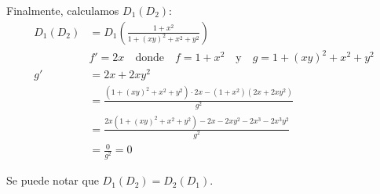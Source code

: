 \documentclass{report}
\begin{document}
    Finalmente, calculamos $D_{1}\left(D_{2}\right)$:
    \[
    \begin{aligned}
    D_{1}\left(D_{2}\right) &= D_{1}\left(\frac{1 + x^{2}}{1 + (xy)^{2} + x^{2} + y^{2}}\right) \\
    &f' = 2x \quad \text{donde} \quad  f = 1 + x^{2} \quad \text{y} \quad g = 1 + (xy)^{2} + x^{2} + y^{2} \\
    g' &= 2x + 2xy^{2} \\
    &= \frac{\left(1 + (xy)^{2} + x^{2} + y^{2}\right) \cdot 2x - \left(1 + x^{2}\right) \left(2x + 2xy^{2}\right)}{g^{2}} \\
    &= \frac{2x \left(1 + (xy)^{2} + x^{2} + y^{2}\right) - 2x - 2xy^{2} - 2x^{3} - 2x^{3} y^{2}}{g^{2}} \\
    &= \frac{0}{g^{2}} = 0
    \end{aligned}
    \]

    Se puede notar que $D_1(D_2) = D_2(D_1)$.
\end{document}
